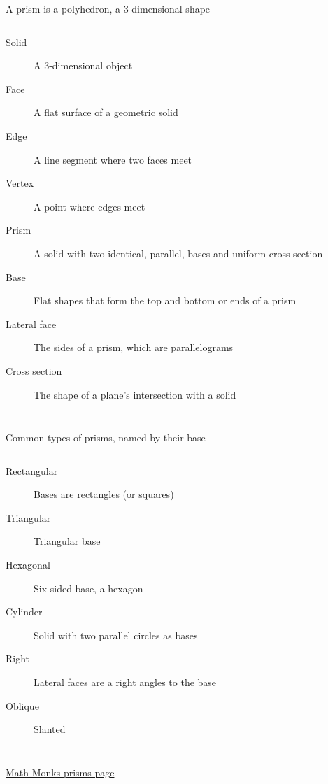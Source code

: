 \begin{frame}{A prism is a polyhedron, a 3-dimensional shape}
    \begin{columns}
      \begin{description}
        \item[Solid] A 3-dimensional object
        \item[Face] A flat surface of a geometric solid
        \item[Edge] A line segment where two faces meet
        \item[Vertex] A point where edges meet 
        \item[Prism] A solid with two identical, parallel, bases and uniform cross section
        \item[Base] Flat shapes that form the top and bottom or ends of a prism
        \item[Lateral face] The sides of a prism, which are parallelograms
        \item[Cross section] The shape of a plane's intersection with a solid
      \end{description}
    \end{columns} \vspace{0.5cm}
  \end{frame}

\begin{frame}{Common types of prisms, named by their base}
  \begin{columns}
    \begin{description}
      \item[Rectangular] Bases are rectangles (or squares)
      \item[Triangular] Triangular base
      \item[Hexagonal] Six-sided base, a hexagon
      \item[Cylinder] Solid with two parallel circles as bases 
      \item[Right] Lateral faces are a right angles to the base
      \item[Oblique] Slanted
    \end{description}
  \end{columns} \vspace{0.5cm}
  \href{https://mathmonks.com/prism}{Math Monks prisms page}
\end{frame}

